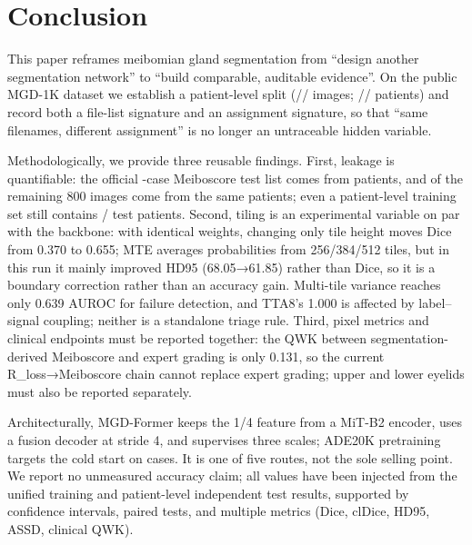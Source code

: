 \section{Conclusion}\label{sec:conclusion}

This paper reframes meibomian gland segmentation from ``design another segmentation network'' to ``build comparable, auditable evidence''. On the public MGD-1K dataset we establish a patient-level split (\nTrain/\nVal/\nTest{} images; \nTrainPatients/\nValPatients/\nTestPatients{} patients) and record both a file-list signature and an assignment signature, so that ``same filenames, different assignment'' is no longer an untraceable hidden variable.

Methodologically, we provide three reusable findings. First, leakage is quantifiable: the official \officialTestImages-case Meiboscore test list comes from \officialTestPatients{} patients, and \officialLeakImages{} of the remaining 800 images come from the same patients; even a patient-level training set still contains \officialLeakPatients/\officialTestPatients{} test patients. Second, tiling is an experimental variable on par with the backbone: with identical weights, changing only tile height moves Dice from 0.370 to 0.655; MTE averages probabilities from 256/384/512 tiles, but in this run it mainly improved HD95 (68.05→61.85) rather than Dice, so it is a boundary correction rather than an accuracy gain. Multi-tile variance reaches only 0.639 AUROC for failure detection, and TTA8's 1.000 is affected by label--signal coupling; neither is a standalone triage rule. Third, pixel metrics and clinical endpoints must be reported together: the QWK between segmentation-derived Meiboscore and expert grading is only 0.131, so the current R\_loss→Meiboscore chain cannot replace expert grading; upper and lower eyelids must also be reported separately.

Architecturally, MGD-Former keeps the 1/4 feature from a MiT-B2 encoder, uses a fusion decoder at stride 4, and supervises three scales; ADE20K pretraining targets the cold start on \nTotal{} cases. It is one of five routes, not the sole selling point. We report no unmeasured accuracy claim; all values have been injected from the unified training and patient-level independent test results, supported by confidence intervals, paired tests, and multiple metrics (Dice, clDice, HD95, ASSD, clinical QWK).
